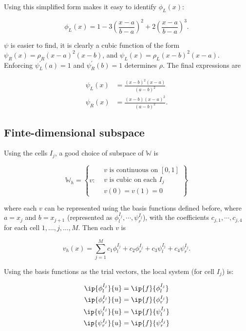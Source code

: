 \documentclass{hw-template}
\newcommand{\W}{\mathbb{W}}
\begin{document}
Using this simplified form makes it easy to identify $\phi_L(x)$:


\begin{equation}
    \phi_L(x) = 1 - 3\left( \frac{x-a}{b-a} \right)^2 + 2 \left( \frac{x-a}{b-a}\right)^3.
\end{equation}

$\psi$ is easier to find, it is clearly a cubic function of the form $\psi_R(x) = \rho_R(x-a)^2(x-b)$, and $\psi_L(x) = \rho_L(x-b)^2(x-a)$. Enforcing $\psi_L^\prime(a)=1$ and $\psi_R^\prime(b) = 1$ determines $\rho$. The final expressions are 

\begin{align}
    \psi_L(x) &= \frac{(x-b)^2(x-a)}{(a-b)^2}\\
    \psi_R(x) &= \frac{(x-b)(x-a)^2}{(a-b)^2}.
\end{align}

\subsection{Finte-dimensional subspace}

Using the cells $I_j$, a good choice of subspace of $\W$ is

\begin{equation*}
    \W_h  = \left\{v :
\begin{aligned}
&v \text{ is continuous on } [0, 1] \\
& v \text{ is cubic on each } I_j \\
&v(0) = v(1) = 0
\end{aligned}
    \right\}
\end{equation*}

where each $v$ can be represented using the basis functions defined before, where $a=x_j$ and $b=x_{j+1}$ (represented as $\phi^{I_j}_{l}, \cdots, \psi^{I_j}_r$), with the coefficients $c_{j, 1}, \cdots, c_{j, 4}$ for each cell $1,\dots, j, \dots, M$. Then each $v$ is

\begin{equation}
    v_h(x) = \sum_{j=1}^M c_1 \phi^{I_j}_{l} + c_2 \phi^{I_j}_{r}      + c_3 \psi^{I_j}_l + c_4 \psi^{I_j}_r.
\end{equation}

Using the basis functions as the trial vectors, the local system (for cell $I_j$) is:

\begin{gather}
    \ip{    \phi^{I_j}_l   }{u} = \ip{f}{\phi^{I_j}_{l}}\\
    \ip{    \phi^{I_j}_r   }{u} = \ip{f}{\phi^{I_j}_{r}}\\
    \ip{    \psi^{I_j}_l    }{u} = \ip{f}{\psi^{I_j}_l}\\
    \ip{    \psi^{I_j}_r  }{u} = \ip{f}{\psi^{I_j}_r}
\end{gather}
\end{document}
